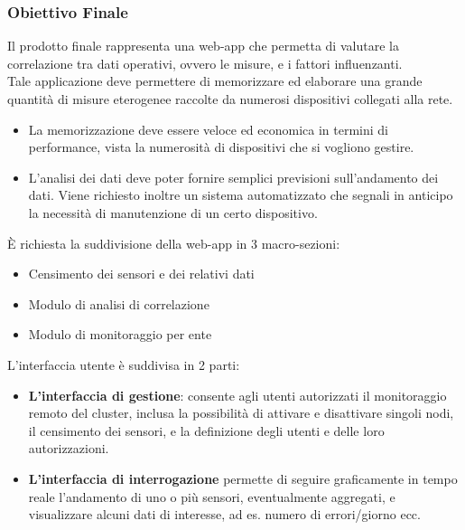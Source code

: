 	\subsubsection{Obiettivo Finale}
	Il prodotto finale rappresenta una web-app che permetta di valutare la correlazione tra dati operativi, ovvero le misure, e i fattori influenzanti.\\
	Tale applicazione deve permettere di memorizzare ed elaborare una grande quantità di misure eterogenee raccolte da numerosi dispositivi collegati alla rete.
	\begin{itemize}
	\item La memorizzazione deve essere veloce ed economica in termini di performance, vista la numerosità di dispositivi che si vogliono gestire.
	\item L'analisi dei dati deve poter fornire semplici previsioni sull'andamento dei dati.
	Viene richiesto inoltre un sistema automatizzato che segnali in anticipo la necessità di manutenzione di un certo dispositivo.	
	\end{itemize}
	È richiesta la suddivisione della web-app in 3 macro-sezioni:
	\begin{itemize}
		\item Censimento dei sensori e dei relativi dati
		\item Modulo di analisi di correlazione
		\item Modulo di monitoraggio per ente
	\end{itemize}
	L'interfaccia utente è suddivisa in 2 parti:
	\begin{itemize}
	\item \textbf{L’interfaccia di gestione}: consente agli utenti autorizzati il monitoraggio remoto del cluster, inclusa la possibilità di attivare e disattivare singoli nodi, il censimento dei sensori, e la definizione degli utenti e delle loro autorizzazioni.
	\item \textbf{L’interfaccia di interrogazione} permette di seguire graficamente in tempo reale l’andamento di uno o più sensori, eventualmente aggregati, e visualizzare alcuni dati di interesse, ad es. numero di errori/giorno ecc.
	\end{itemize}

